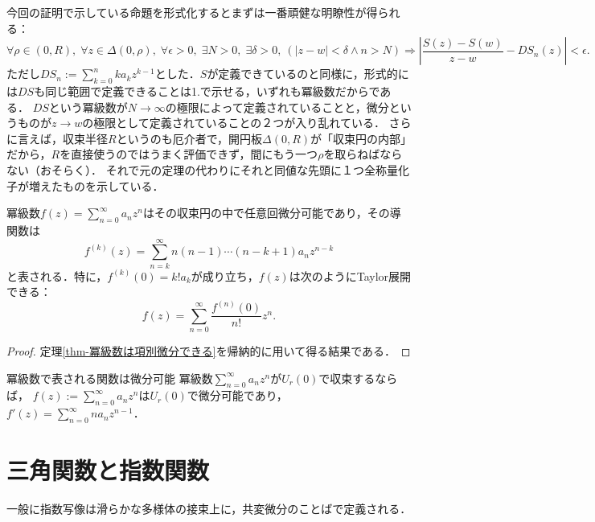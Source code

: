 \documentclass[uplatex, dvipdfmx]{jsreport}
\begin{document}
\begin{remark}
    今回の証明で示している命題を形式化するとまずは一番頑健な明瞭性が得られる：
    \[ \forall\rho\in(0,R),\;\forall z\in\Delta(0,\rho),\;\forall\epsilon>0,\;\exists N>0,\;\exists\delta>0,\ (|z-w|<\delta\land n>N)\Rightarrow\left|\frac{S(z)-S(w)}{z-w}-DS_n(z)\right|<\epsilon. \]
    ただし$DS_n:=\sum^n_{k=0}ka_kz^{k-1}$とした．$S$が定義できているのと同様に，形式的には$DS$も同じ範囲で定義できることは1.で示せる，いずれも冪級数だからである．
    $DS$という冪級数が$N\to\infty$の極限によって定義されていることと，微分というものが$z\to w$の極限として定義されていることの２つが入り乱れている．
    さらに言えば，収束半径$R$というのも厄介者で，開円板$\Delta(0,R)$が「収束円の内部」だから，$R$を直接使うのではうまく評価できず，間にもう一つ$\rho$を取らねばならない（おそらく）．
    それで元の定理の代わりにそれと同値な先頭に１つ全称量化子が増えたものを示している．
\end{remark}

\begin{theorem}
    冪級数$f(z)=\sum^\infty_{n=0}a_nz^n$はその収束円の中で任意回微分可能であり，その導関数は
    \[f^{(k)}(z)=\sum^\infty_{n=k}n(n-1)\cdots(n-k+1)a_nz^{n-k}\]
    と表される．特に，$f^{(k)}(0)=k!a_k$が成り立ち，$f(z)$は次のようにTaylor展開できる：
    \[ f(z)=\sum^\infty_{n=0}\frac{f^{(n)}(0)}{n!}z^n. \]
\end{theorem}
\begin{proof}
    定理\ref{thm-冪級数は項別微分できる}を帰納的に用いて得る結果である．
\end{proof}

\begin{itembox}[l]{冪級数で表される関数は微分可能}
    冪級数$\sum^\infty_{n=0}a_nz^n$が$U_r(0)$で収束するならば，
    $f(z):=\sum^\infty_{n=0}a_nz^n$は$U_r(0)$で微分可能であり，
    $f'(z)=\sum^\infty_{n=0}na_nz^{n-1}$．
\end{itembox}

\section{三角関数と指数関数}

\begin{screen}
    一般に指数写像は滑らかな多様体の接束上に，共変微分のことばで定義される．
\end{screen}
\end{document}
